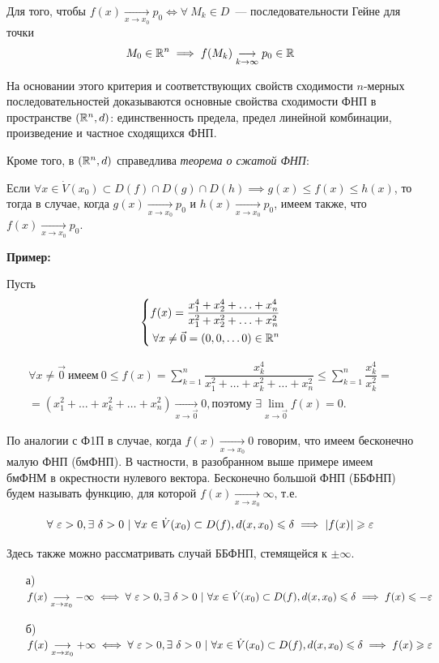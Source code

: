 \documentclass[../../main.tex]{subfiles}
\begin{document}
Для того, чтобы $f(x)\underset{x \to x_0}{\longrightarrow}p_0 \iff
\forall\ M_k \in D$~--- последовательности Гейне для точки 
\[M_0 \in \mathbb{R}^n \implies f(M_k)\underset{k \to \infty}
{\longrightarrow}p_0 \in \mathbb{R}\]   

На основании этого критерия и соответствующих свойств сходимости $n$-мерных
последовательностей доказываются основные свойства сходимости ФНП
в пространстве $(\mathbb{R}^n, d)$: единственность предела, предел линейной
комбинации, произведение и частное сходящихся ФНП.

Кроме того, в $(\mathbb{R}^n, d)$ справедлива \emph{теорема о сжатой ФНП}:

Если $\forall x \in \dot{V}(x_0) \subset D(f) \cap D(g) \cap D(h) \implies
g(x) \leq f(x) \leq h(x)$, то тогда в случае, когда
$g(x)\underset{x \to x_0}{\longrightarrow}p_0
$ и $h(x)\underset{x \to x_0}{\longrightarrow}p_0$,
имеем также, что $f(x)\underset{x \to x_0}{\longrightarrow}p_0$.

\textbf{Пример:}

Пусть \[ \left\{\begin{aligned}
	f(x) = \dfrac{x_1^4 + x_2^4 + \ldots + x_n^4}{x_1^2 + x_2^2 +
		\ldots + x_n^2} \\
	\forall x \ne \vec{0} = (0, 0, \ldots 0) \in \mathbb{R}^n
\end{aligned}\right. \]

\begin{gather*}
	\forall x \ne \vec{0}\ \text{имеем}\ 0 \leq f(x) =
	\displaystyle\sum_{k=1}^{n}{\dfrac{x_k^4}{x_1^2 + \dots + x_k^2 +
			\ldots + x_n^2}} \le
	\displaystyle\sum_{k=1}^{n}{\dfrac{x_k^4}{x_k^2}} = \\ =
	(x_1^2 + \ldots + x_k^2 + \ldots + x_n^2)
	\underset{x \to \vec{0}}{\longrightarrow}0, \text{поэтому }
	\exists\displaystyle\lim_{x \to \vec{0}}f(x) = 0.
\end{gather*}

По аналогии с Ф1П в случае, когда $f(x)\underset{x \to x_0}{\longrightarrow}0$
говорим, что имеем бесконечно малую ФНП (бмФНП). В частности,
в разобранном выше примере имеем бмФНМ в окрестности нулевого вектора.
Бесконечно большой ФНП (ББФНП) будем называть функцию,
для которой $f(x)\underset{x \to x_0}{\longrightarrow}\infty$, т.е.

\[\forall\ \varepsilon > 0, \exists\ \delta > 0\ |\
\forall x \in \dot{V}(x_0) \subset D(f), d(x, x_0) \leqslant \delta
\implies |f(x)| \geqslant \varepsilon\]

Здесь также можно рассматривать случай ББФНП, стемящейся к $\pm \infty$.
\begin{itemize}
	\item[а)] $f(x)\underset{x \to x_0}{\longrightarrow} -\infty \iff
	\forall\ \varepsilon > 0, \exists\ \delta > 0\ |\
	\forall x \in \dot{V}(x_0) \subset D(f), d(x, x_0) \leqslant \delta
	\implies f(x) \leqslant -\varepsilon$
	\item[б)] $f(x)\underset{x \to x_0}{\longrightarrow} +\infty \iff
	\forall\ \varepsilon > 0, \exists\ \delta > 0\ |\
	\forall x \in \dot{V}(x_0) \subset D(f), d(x, x_0) \leqslant \delta
	\implies f(x) \geqslant \varepsilon$
\end{itemize}
\end{document}
